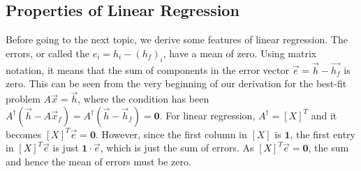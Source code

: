 \subsection{Properties of Linear Regression}

Before going to the next topic, we derive some features of linear regression. The errors, or called the  $e_i = h_i - (h_f)_i$, have a mean of zero. Using matrix notation, it means that the sum of components in the error vector $\vec{e} = \vec{h} - \vec{h_f}$ is zero. This can be seen from the very beginning of our derivation for the best-fit problem $A\vec{x} = \vec{h}$, where the condition has been $A^\dag (\vec{h} - A\vec{x}_f) = A^\dag (\vec{h} - \vec{h}_f) = \textbf{0}$. For linear regression, $A^\dag =[X]^T$ and it becomes $[X]^T\vec{e} = \textbf{0}$. However, since the first column in $[X]$ is $\textbf{1}$, the first entry in $[X]^T\vec{e}$ is just $\textbf{1} \cdot \vec{e}$, which is just the sum of errors. As $[X]^T\vec{e} = \textbf{0}$, the sum and hence the mean of errors must be zero.\par

